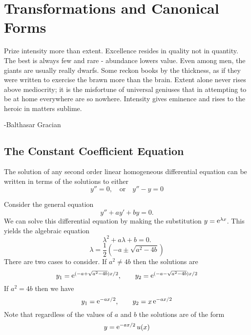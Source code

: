 \flushbottom




\chapter{Transformations and Canonical Forms}



Prize intensity more than extent.  Excellence resides in quality not in 
quantity.  The best is always few and rare - abundance lowers value.
Even among men, the giants are usually really dwarfs.  Some reckon books
by the thickness, as if they were written to exercise the brawn more
than the brain.  Extent alone never rises above mediocrity; it is the 
misfortune of universal geniuses that in attempting to be at home
everywhere are so nowhere.  Intensity gives eminence and rises to the heroic 
in matters sublime.

\begin{flushright}
  -Balthasar Gracian
\end{flushright}






\section{The Constant Coefficient Equation}


The solution of any second order linear homogeneous differential equation
can be written in terms of the solutions to either
\[
y'' = 0, \quad \mathrm{or} \quad y'' - y = 0
\]

Consider the general equation
\[
y'' + a y' + b y = 0.
\]
We can solve this differential equation by making the substitution
$y = \mathop{\mathrm{e}}\nolimits^{\lambda x}$.  This yields the algebraic equation
\[
\lambda^2 + a \lambda + b = 0.
\]
\[
\lambda = \frac{1}{2}\left( -a \pm \sqrt{a^2 - 4b} \right)
\]
There are two cases to consider.  If $a^2 \neq 4b$ then the solutions are
\[
y_1 = \mathop{\mathrm{e}}\nolimits^{(-a + \sqrt{a^2 - 4b}) x / 2}, \qquad
y_2 = \mathop{\mathrm{e}}\nolimits^{(-a - \sqrt{a^2 - 4b}) x / 2}
\]
If $a^2 = 4b$ then we have
\[
y_1 = \mathop{\mathrm{e}}\nolimits^{-a x / 2}, \qquad y_2 = x \mathop{\mathrm{e}}\nolimits^{-a x / 2}
\]
Note that regardless of the values of $a$ and $b$ the solutions are of the 
form
\[
y = \mathop{\mathrm{e}}\nolimits^{-a x / 2} u(x)
\]



